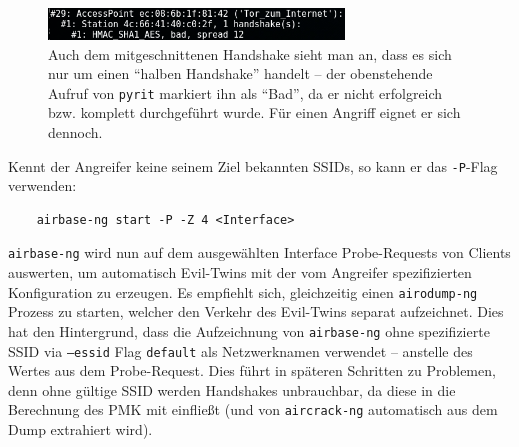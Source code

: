 \begin{figure}[ht]
	\centering
	\includegraphics[width=0.7\textwidth]{graphics/pyrit_analyze}
	\caption[Pyrit]{Auch dem mitgeschnittenen Handshake sieht man an, dass es sich nur um einen \enquote{halben Handshake} handelt -- der obenstehende Aufruf von \texttt{pyrit} markiert ihn als \enquote{Bad}, da er nicht erfolgreich bzw. komplett durchgeführt wurde. Für einen Angriff eignet er sich dennoch.}
\end{figure}
\FloatBarrier

Kennt der Angreifer keine seinem Ziel bekannten SSIDs, so kann er das \texttt{-P}-Flag verwenden:
\begin{Verbatim}
	airbase-ng start -P -Z 4 <Interface>
\end{Verbatim}

\texttt{airbase-ng} wird nun auf dem ausgewählten Interface Probe-Requests von Clients auswerten, um automatisch Evil-Twins mit der vom Angreifer spezifizierten Konfiguration zu erzeugen.
Es empfiehlt sich, gleichzeitig einen \texttt{airodump-ng} Prozess zu starten, welcher den Verkehr des Evil-Twins separat aufzeichnet.
Dies hat den Hintergrund, dass die Aufzeichnung von \texttt{airbase-ng} ohne spezifizierte SSID via \texttt{--essid} Flag \texttt{default} als Netzwerknamen verwendet -- anstelle des Wertes aus dem Probe-Request. Dies führt in späteren Schritten zu Problemen, denn ohne gültige SSID werden Handshakes unbrauchbar, da diese in die Berechnung des PMK mit einfließt (und von \texttt{aircrack-ng} automatisch aus dem Dump extrahiert wird).

